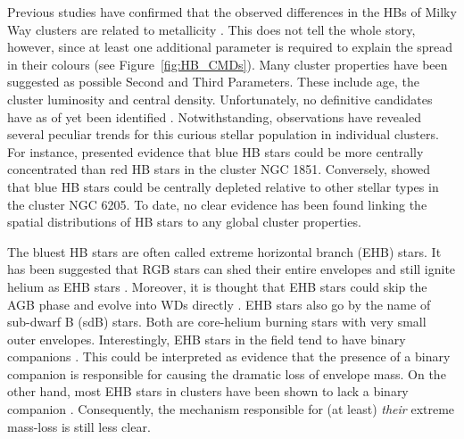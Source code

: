 Previous studies have confirmed that the 
observed differences in the HBs of Milky Way clusters
are related to metallicity \citep{sandage60}.  This does not tell the
whole story, however, since at least one
additional parameter is required to explain the spread in their
colours (see Figure~\ref{fig:HB_CMDs}).  Many cluster properties have been
suggested as possible 
Second and Third Parameters.  These include age, the 
cluster luminosity and central density.  Unfortunately, no 
definitive candidates have as of yet been 
identified \citep[e.g.][]{rood73, fusi93}.  Notwithstanding,
observations have revealed several peculiar trends for this curious
stellar population in individual clusters.  For instance,
\citet{saviane98}
presented evidence that blue HB stars could be more centrally
concentrated than red HB stars in the cluster NGC
1851.  Conversely, \citet{cohen97} showed that blue HB stars could be
centrally depleted relative to other stellar types in the cluster NGC
6205.  To date, no clear evidence has been found linking the spatial 
distributions of HB stars to any global cluster properties.

The bluest HB stars are often called extreme horizontal branch (EHB)
stars.  It has been
suggested that RGB stars can shed their entire envelopes and still
ignite helium as EHB stars \citep{dcruz96}.  Moreover, it is thought
that EHB stars could skip the AGB phase and evolve into WDs directly
\citep[e.g.][]{maeder09}.  
EHB stars also go by the name of sub-dwarf B (sdB) stars.  Both 
are core-helium burning stars with very small outer envelopes.  
Interestingly, EHB stars in the field tend to have binary companions
\citep{maxted01}.  This could be interpreted as evidence that the 
presence of a binary companion is responsible for causing the dramatic
loss of envelope mass.  On the other hand, most
EHB stars in clusters have been shown to lack a binary companion
\citep[e.g.][]{monibidin06, monibidin09, monibidin11}.  Consequently,
the mechanism responsible for (at least) \textit{their} extreme mass-loss is
still less clear. 


